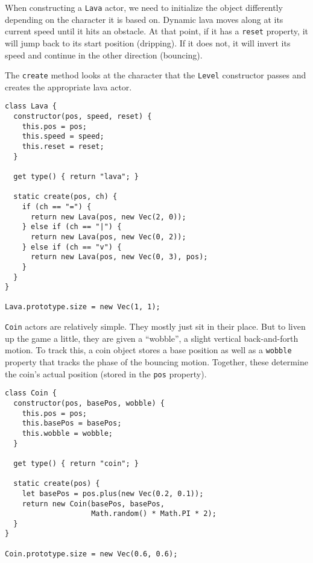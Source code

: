 When constructing a \lstinline`Lava` actor, we need to initialize the object differently depending on the character it is based on. Dynamic lava moves along at its current speed until it hits an obstacle. At that point, if it has a \lstinline`reset` property, it will jump back to its start position (dripping). If it does not, it will invert its speed and continue in the other direction (bouncing).

The \lstinline`create` method looks at the character that the \lstinline`Level` constructor passes and creates the appropriate lava actor.

\begin{lstlisting}
class Lava {
  constructor(pos, speed, reset) {
    this.pos = pos;
    this.speed = speed;
    this.reset = reset;
  }

  get type() { return "lava"; }

  static create(pos, ch) {
    if (ch == "=") {
      return new Lava(pos, new Vec(2, 0));
    } else if (ch == "|") {
      return new Lava(pos, new Vec(0, 2));
    } else if (ch == "v") {
      return new Lava(pos, new Vec(0, 3), pos);
    }
  }
}

Lava.prototype.size = new Vec(1, 1);
\end{lstlisting}
\noindent{}

\lstinline`Coin` actors are relatively simple. They mostly just sit in their place. But to liven up the game a little, they are given a ``wobble'', a slight vertical back-and-forth motion. To track this, a coin object stores a base position as well as a \lstinline`wobble` property that tracks the phase of the bouncing motion. Together, these determine the coin's actual position (stored in the \lstinline`pos` property).

\begin{lstlisting}
class Coin {
  constructor(pos, basePos, wobble) {
    this.pos = pos;
    this.basePos = basePos;
    this.wobble = wobble;
  }

  get type() { return "coin"; }

  static create(pos) {
    let basePos = pos.plus(new Vec(0.2, 0.1));
    return new Coin(basePos, basePos,
                    Math.random() * Math.PI * 2);
  }
}

Coin.prototype.size = new Vec(0.6, 0.6);
\end{lstlisting}
\noindent{}

